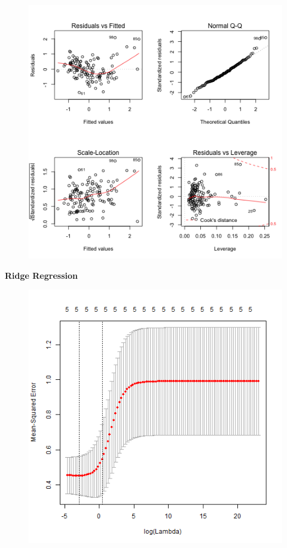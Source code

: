 \documentclass{article}
\begin{document}
\begin{figure}[h!]
\includegraphics{../images/lm_top.png}
\end{figure}


\textbf{Ridge Regression} \newline
\begin{figure}[h!]
\includegraphics{../images/ridgeCV_top.png}
\end{figure}
\end{document}
